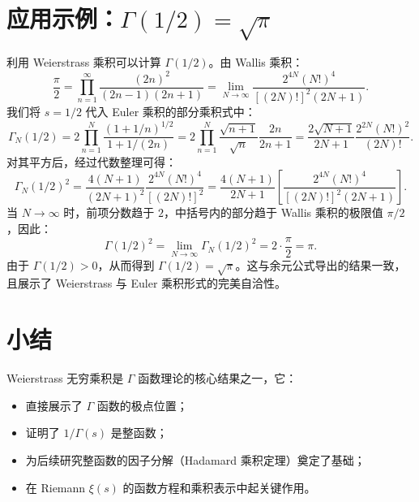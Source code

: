 \section{应用示例：\texorpdfstring{$\Gamma(1/2) = \sqrt{\pi}$}{Gamma(1/2) = sqrt(pi)}}

利用 Weierstrass 乘积可以计算 \(\Gamma(1/2)\)。由 Wallis 乘积：
\[
\frac{\pi}{2} = \prod_{n=1}^\infty \frac{(2n)^2}{(2n-1)(2n+1)} = \lim_{N \to \infty} \frac{2^{4N} (N!)^4}{[(2N)!]^2 (2N+1)}.
\]
我们将 \(s = 1/2\) 代入 Euler 乘积的部分乘积式中：
\[
\Gamma_N(1/2) = 2 \prod_{n=1}^N \frac{(1+1/n)^{1/2}}{1+1/(2n)} = 2 \prod_{n=1}^N \frac{\sqrt{n+1}}{\sqrt{n}} \frac{2n}{2n+1} = \frac{2\sqrt{N+1}}{2N+1} \frac{2^{2N}(N!)^2}{(2N)!}.
\]
对其平方后，经过代数整理可得：
\[
\Gamma_N(1/2)^2 = \frac{4(N+1)}{(2N+1)^2} \frac{2^{4N}(N!)^4}{[(2N)!]^2} = \frac{4(N+1)}{2N+1} \left[ \frac{2^{4N}(N!)^4}{[(2N)!]^2(2N+1)} \right].
\]
当 \(N \to \infty\) 时，前项分数趋于 \(2\)，中括号内的部分趋于 Wallis 乘积的极限值 \(\pi/2\)，因此：
\[
\Gamma(1/2)^2 = \lim_{N \to \infty} \Gamma_N(1/2)^2 = 2 \cdot \frac{\pi}{2} = \pi.
\]
由于 \(\Gamma(1/2) > 0\)，从而得到 \(\Gamma(1/2) = \sqrt{\pi}\)。这与余元公式导出的结果一致，且展示了 Weierstrass 与 Euler 乘积形式的完美自洽性。

\section{小结}

Weierstrass 无穷乘积是 $\Gamma$ 函数理论的核心结果之一，它：
\begin{itemize}
    \item 直接展示了 $\Gamma$ 函数的极点位置；
    \item 证明了 \(1/\Gamma(s)\) 是整函数；
    \item 为后续研究整函数的因子分解（Hadamard 乘积定理）奠定了基础；
    \item 在 Riemann \(\xi(s)\) 的函数方程和乘积表示中起关键作用。
\end{itemize}

